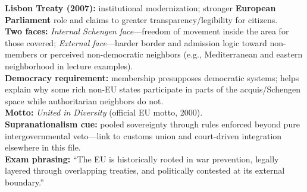 \documentclass[10pt,a4paper]{article}
\begin{document}
{\textbf{Lisbon Treaty (2007):} institutional modernization; stronger \textbf{European Parliament} role and claims to greater transparency/legibility for citizens.\\
\textbf{Two faces:} \textit{Internal Schengen face}---freedom of movement inside the area for those covered; \textit{External face}---harder border and admission logic toward non-members or perceived non-democratic neighbors (e.g., Mediterranean and eastern neighborhood in lecture examples).\\
\textbf{Democracy requirement:} membership presupposes democratic systems; helps explain why some rich non-EU states participate in parts of the acquis/Schengen space while authoritarian neighbors do not.\\
\textbf{Motto:} \textit{United in Diversity} (official EU motto, 2000).\\
\textbf{Supranationalism cue:} pooled sovereignty through rules enforced beyond pure intergovernmental veto---link to customs union and court-driven integration elsewhere in this file.\\
\textbf{Exam phrasing:} ``The EU is historically rooted in war prevention, legally layered through overlapping treaties, and politically contested at its external boundary.''
}
\end{document}
